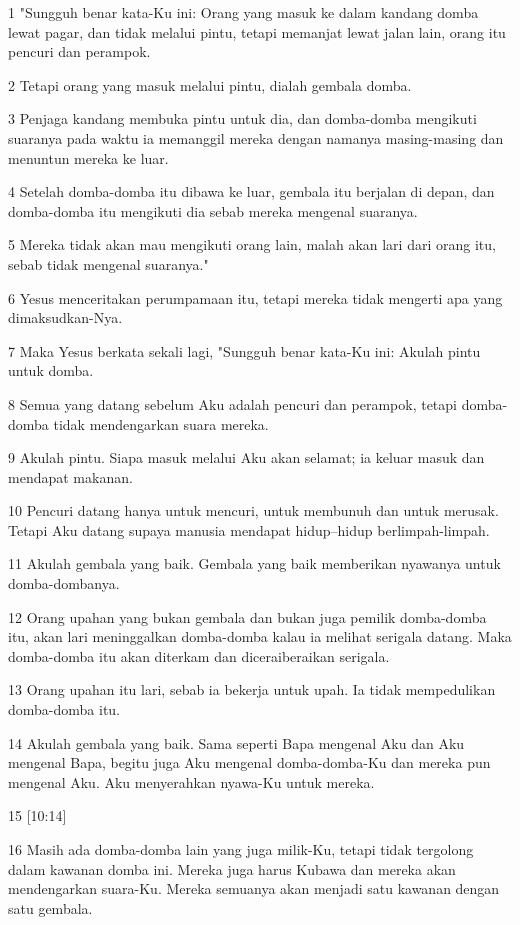 \par 1 "Sungguh benar kata-Ku ini: Orang yang masuk ke dalam kandang domba lewat pagar, dan tidak melalui pintu, tetapi memanjat lewat jalan lain, orang itu pencuri dan perampok.
\par 2 Tetapi orang yang masuk melalui pintu, dialah gembala domba.
\par 3 Penjaga kandang membuka pintu untuk dia, dan domba-domba mengikuti suaranya pada waktu ia memanggil mereka dengan namanya masing-masing dan menuntun mereka ke luar.
\par 4 Setelah domba-domba itu dibawa ke luar, gembala itu berjalan di depan, dan domba-domba itu mengikuti dia sebab mereka mengenal suaranya.
\par 5 Mereka tidak akan mau mengikuti orang lain, malah akan lari dari orang itu, sebab tidak mengenal suaranya."
\par 6 Yesus menceritakan perumpamaan itu, tetapi mereka tidak mengerti apa yang dimaksudkan-Nya.
\par 7 Maka Yesus berkata sekali lagi, "Sungguh benar kata-Ku ini: Akulah pintu untuk domba.
\par 8 Semua yang datang sebelum Aku adalah pencuri dan perampok, tetapi domba-domba tidak mendengarkan suara mereka.
\par 9 Akulah pintu. Siapa masuk melalui Aku akan selamat; ia keluar masuk dan mendapat makanan.
\par 10 Pencuri datang hanya untuk mencuri, untuk membunuh dan untuk merusak. Tetapi Aku datang supaya manusia mendapat hidup--hidup berlimpah-limpah.
\par 11 Akulah gembala yang baik. Gembala yang baik memberikan nyawanya untuk domba-dombanya.
\par 12 Orang upahan yang bukan gembala dan bukan juga pemilik domba-domba itu, akan lari meninggalkan domba-domba kalau ia melihat serigala datang. Maka domba-domba itu akan diterkam dan diceraiberaikan serigala.
\par 13 Orang upahan itu lari, sebab ia bekerja untuk upah. Ia tidak mempedulikan domba-domba itu.
\par 14 Akulah gembala yang baik. Sama seperti Bapa mengenal Aku dan Aku mengenal Bapa, begitu juga Aku mengenal domba-domba-Ku dan mereka pun mengenal Aku. Aku menyerahkan nyawa-Ku untuk mereka.
\par 15 [10:14]
\par 16 Masih ada domba-domba lain yang juga milik-Ku, tetapi tidak tergolong dalam kawanan domba ini. Mereka juga harus Kubawa dan mereka akan mendengarkan suara-Ku. Mereka semuanya akan menjadi satu kawanan dengan satu gembala.
